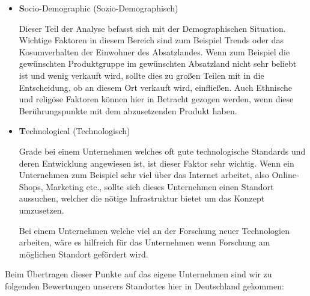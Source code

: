 \begin{itemize}
            \item \textbf Socio-Demographic (Sozio-Demographisch)
            
                Dieser Teil der Analyse befasst sich mit der Demographischen Situation. Wichtige Faktoren in diesem 
                Bereich sind zum Beispiel Trends oder das Kosumverhalten der Einwohner des Absatzlandes. Wenn zum 
                Beispiel die gewünschten Produktgruppe im gewünschten Absatzland nicht sehr beliebt ist und wenig 
                verkauft wird, sollte dies zu großen Teilen mit in die Entscheidung, ob an diesem Ort verkauft wird, 
                einfließen. Auch Ethnische und religöse Faktoren können hier in Betracht gezogen werden, wenn diese 
                Berührungspunkte mit dem abzusetzenden Produkt haben.

            \item \textbf Technological (Technologisch)
            
                Grade bei einem Unternehmen welches oft gute technologische Standards und deren Entwicklung angewiesen 
                ist, ist dieser Faktor sehr wichtig. Wenn ein Unternehmen zum Beispiel sehr viel über das Internet 
                arbeitet, also Online-Shops, Marketing etc., sollte sich dieses Unternehmen einen Standort aussuchen,
                welcher die nötige Infrastruktur bietet um das Konzept umzusetzen.

                Bei einem Unternehmen welche viel an der Forschung neuer Technologien arbeiten, wäre es hilfreich für 
                das Unternehmen wenn Forschung am möglichen Standort gefördert wird.
        \end{itemize}

    Beim Übertragen dieser Punkte auf das eigene Unternehmen sind wir zu folgenden Bewertungen unserers Standortes hier
    in Deutschland gekommen:

